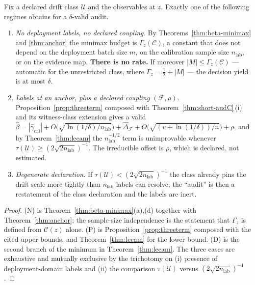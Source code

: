 \begin{theorem}[Dichotomy]\label{thm:dichotomy}
Fix a declared drift class $\mathcal U$ and the observables at $z$. Exactly one of the
following regimes obtains for a $\delta$-valid audit.
\begin{enumerate}
\item[\textnormal{(N)}]\emph{No deployment labels, no declared coupling.} By
Theorems~\ref{thm:beta-minimax} and \ref{thm:anchor} the minimax budget is
$\Gamma_z(\mathcal C)$, a constant that does not depend on the deployment batch size $m$, on
the calibration sample size $n_{\mathrm{lab}}$, or on the evidence map. \textbf{There is no
rate.} If moreover $|M|\le\Gamma_z(\mathcal C)$ --- automatic for the unrestricted class,
where $\Gamma_z=\tfrac12+|M|$ --- the decision yield is at most $\delta$.
\item[\textnormal{(P)}]\emph{Labels at an anchor, plus a declared coupling
$(\mathcal F,\rho)$.} Proposition~\ref{prop:threeterm} composed with
Theorem~\ref{thm:short-audC}\,(i) and its witness-class extension gives a valid
$\widehat\beta=|\widehat\gamma_{\mathrm{cal}}|
+O\bigl(\sqrt{\ln(1/\delta)/n_{\mathrm{lab}}}\bigr)
+\widehat\Delta_{\mathcal F}+O\bigl(\sqrt{(v+\ln(1/\delta))/n}\bigr)+\rho$,
and by Theorem~\ref{thm:lecam} the $n_{\mathrm{lab}}^{-1/2}$ term is unimprovable whenever
$\tau(\mathcal U)\ge(2\sqrt{2n_{\mathrm{lab}}})^{-1}$. The irreducible offset is $\rho$,
which is declared, not estimated.
\item[\textnormal{(D)}]\emph{Degenerate declaration.} If $\tau(\mathcal U)<(2\sqrt{2n_{\mathrm{lab}}})^{-1}$
the class already pins the drift scale more tightly than $n_{\mathrm{lab}}$ labels can
resolve; the ``audit'' is then a restatement of the class declaration and the labels are
inert.
\end{enumerate}
\end{theorem}
\begin{proof}
(N) is Theorem~\ref{thm:beta-minimax}(a),(d) together with Theorem~\ref{thm:anchor}; the
sample-size independence is the statement that $\Gamma_z$ is defined from $\mathcal C(z)$
alone. (P) is Proposition~\ref{prop:threeterm} composed with the cited upper bounds, and
Theorem~\ref{thm:lecam} for the lower bound. (D) is the second branch of the minimum in
Theorem~\ref{thm:lecam}. The three cases are exhaustive and mutually exclusive by the
trichotomy on (i) presence of deployment-domain labels and (ii) the comparison
$\tau(\mathcal U)$ versus $(2\sqrt{2n_{\mathrm{lab}}})^{-1}$.
\end{proof}

